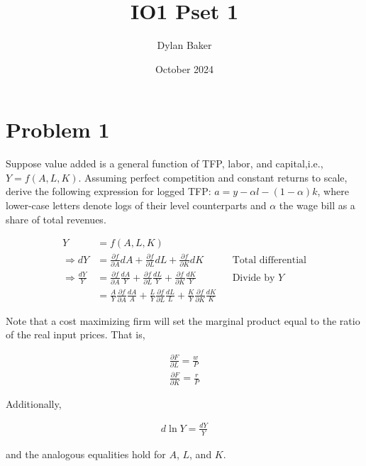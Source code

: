 \documentclass[10pt]{article}
\title{IO1 Pset 1}
\author{Dylan Baker}
\date{October 2024}
\begin{document}
\maketitle

\section{Problem 1}

Suppose value added is a general function of TFP, labor, and capital,i.e., 
$Y=f(A, L, K)$. Assuming perfect competition and constant returns to scale, 
derive the following expression for logged TFP: $a=y-\alpha l-(1-\alpha) k$, 
where lower-case letters denote logs of their level counterparts and $\alpha$ the 
wage bill as a share of total revenues.

\hrulefill\hspace{0.5em}\dotfill\hspace{0.5em}\hrulefill

\begin{align}
    Y &= f(A, L, K) \\
    \Rightarrow d Y &= \frac{\partial f}{\partial A} d A + \frac{\partial f}{\partial L} d L + \frac{\partial f}{\partial K} d K && \text{Total differential} \\
    \Rightarrow \frac{d Y}{Y} &= \frac{\partial f}{\partial A} \frac{d A}{Y} + \frac{\partial f}{\partial L} \frac{d L}{Y} + \frac{\partial f}{\partial K} \frac{d K}{Y} && \text{Divide by $Y$} \\
    &= \frac{A}{Y} \frac{\partial f}{\partial A} \frac{d A}{A} + \frac{L}{Y} \frac{\partial f}{\partial L} \frac{d L}{L} + \frac{K}{Y} \frac{\partial f}{\partial K} \frac{d K}{K} \label{eq:io1_pset1_q1_dyy}
\end{align}

Note that a cost maximizing firm will set the 
marginal product equal to the ratio of the real input prices.
That is,

\begin{align}
    \frac{\partial F}{\partial L}=\frac{w}{P} \\
    \frac{\partial F}{\partial K}=\frac{r}{P}
\end{align}

Additionally, 

\begin{align}
    d \ln Y = \frac{d Y}{Y}
\end{align}

and the analogous equalities hold for $A$, $L$, and $K$.
\end{document}
